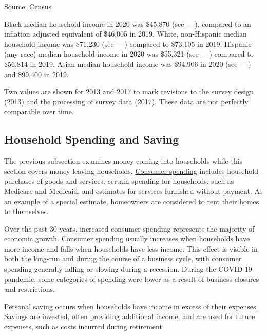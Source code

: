 \documentclass{report}
\begin{document}
{\begin{minipage}{0.37\textwidth}
\footnotesize{Source: Census} 
\end{minipage}\hspace{4mm}
\begin{minipage}{0.36\textwidth}
\small Black median household income in 2020 was \$45,870 (see {\color{blue!80!black}\textbf{---}}), compared to an inflation adjusted equivalent of \$46,005 in 2019. White, non-Hispanic median household income was \$71,230 (see {\color{green!80!black}\textbf{---}}) compared to \$73,105 in 2019. Hispanic (any race) median household income in 2020 was \$55,321 (see {\color{red!90!black}\textbf{---}}) compared to \$56,814 in 2019. Asian median household income was \$94,906 in 2020 (see {\color{orange}\textbf{---}}) and \$99,400 in 2019. 

Two values are shown for 2013 and 2017 to mark revisions to the survey design (2013) and the processing of survey data (2017). These data are not perfectly comparable over time. 
\end{minipage}
\newpage 
\begin{minipage}{0.76\textwidth}
\subsection*{\color{black!70} \seriffont Household Spending and Saving}
\small The previous subsection examines money coming into households while this section covers money leaving households. \href{https://www.bea.gov/data/consumer-spending/main}{Consumer spending} includes household purchases of goods and services, certain spending for households, such as Medicare and Medicaid, and estimates for services furnished without payment. As an example of a special estimate, homeowners are considered to rent their homes to themselves. 

Over the past 30 years, increased consumer spending represents the majority of economic growth. Consumer spending usually increases when households have more income and falls when households have less income. This effect is visible in both the long-run and during the course of a business cycle, with consumer spending generally falling or slowing during a recession. During the COVID-19 pandemic, some categories of spending were lower as a result of business closures and restrictions.

\href{https://www.bea.gov/data/income-saving/personal-saving-rate}{Personal saving} occurs when households have income in excess of their expenses. Savings are invested, often providing additional income, and are used for future expenses, such as costs incurred during retirement.


\end{minipage}}
\end{document}
